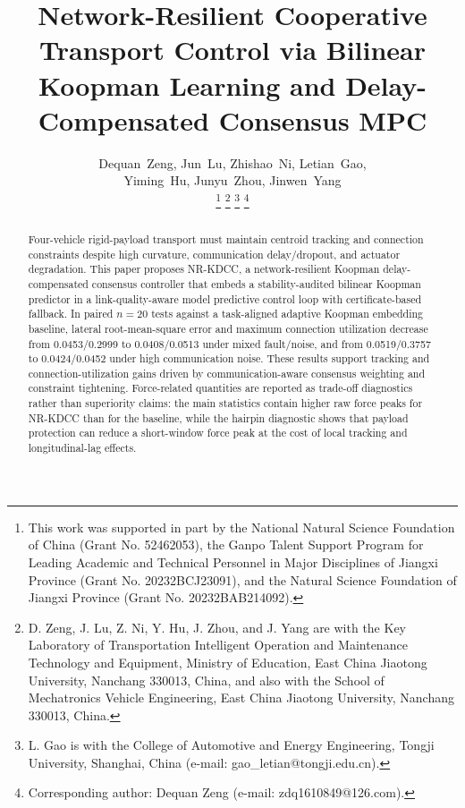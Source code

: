 \documentclass[letterpaper,journal]{IEEEtran}
\begin{document}
\title{Network-Resilient Cooperative Transport Control via Bilinear Koopman Learning and Delay-Compensated Consensus MPC}
\author{\parbox{\textwidth}{\centering Dequan~Zeng, Jun~Lu, Zhishao~Ni, Letian~Gao,\\
Yiming~Hu, Junyu~Zhou, Jinwen~Yang}%
\thanks{This work was supported in part by the National Natural Science Foundation of China (Grant No. 52462053), the Ganpo Talent Support Program for Leading Academic and Technical Personnel in Major Disciplines of Jiangxi Province (Grant No. 20232BCJ23091), and the Natural Science Foundation of Jiangxi Province (Grant No. 20232BAB214092).}%
\thanks{D. Zeng, J. Lu, Z. Ni, Y. Hu, J. Zhou, and J. Yang are with the Key Laboratory of Transportation Intelligent Operation and Maintenance Technology and Equipment, Ministry of Education, East China Jiaotong University, Nanchang 330013, China, and also with the School of Mechatronics Vehicle Engineering, East China Jiaotong University, Nanchang 330013, China.}%
\thanks{L. Gao is with the College of Automotive and Energy Engineering, Tongji University, Shanghai, China (e-mail: gao\_letian@tongji.edu.cn).}%
\thanks{Corresponding author: Dequan Zeng (e-mail: zdq1610849@126.com).}}



\maketitle

\begin{abstract}
Four-vehicle rigid-payload transport must maintain centroid tracking and connection constraints despite high curvature, communication delay/dropout, and actuator degradation. This paper proposes NR-KDCC, a network-resilient Koopman delay-compensated consensus controller that embeds a stability-audited bilinear Koopman predictor in a link-quality-aware model predictive control loop with certificate-based fallback. In paired $n=20$ tests against a task-aligned adaptive Koopman embedding baseline, lateral root-mean-square error and maximum connection utilization decrease from 0.0453/0.2999 to 0.0408/0.0513 under mixed fault/noise, and from 0.0519/0.3757 to 0.0424/0.0452 under high communication noise. These results support tracking and connection-utilization gains driven by communication-aware consensus weighting and constraint tightening. Force-related quantities are reported as trade-off diagnostics rather than superiority claims: the main statistics contain higher raw force peaks for NR-KDCC than for the baseline, while the hairpin diagnostic shows that payload protection can reduce a short-window force peak at the cost of local tracking and longitudinal-lag effects.
\end{abstract}
\end{document}
